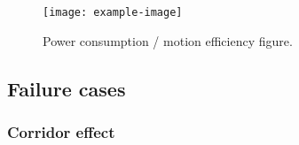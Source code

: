 \begin{figure} [htpb]
	\centering
	\texttt{[image: example-image]}
	\caption{Power consumption / motion efficiency figure.}
	\label{fig:moiton_power}
\end{figure}

\subsection{Failure cases}
\label{sec:fail}

\subsubsection{Corridor effect}
\label{sec:forest_canyon}

\lightlipsum[1]


